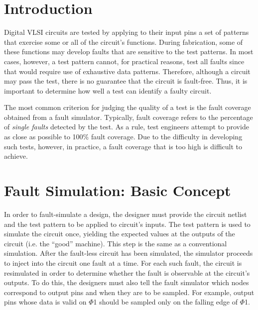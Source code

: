 \newcommand{\bracket}[1]{$\left<\mbox{#1}\right>$}
\newcommand{\BKT}[1]{\bracket{\em #1}}
\newcommand{\OPT}[1]{$\left[\mbox{#1}\right]$}
\newcommand{\irsim}{{\it Irsim}}
\newcommand{\ifsim}{{\it Ifsim}}
\newcommand{\BU}{\mbox{$\bullet$}\ }

\section{Introduction}

Digital VLSI circuits are tested by applying to their input pins a set of
patterns that exercise some or all of the circuit's functions.  During
fabrication, some of these functions may develop faults that are sensitive
to the test patterns.  In most cases, however, a test pattern cannot, for
practical reasons, test all faults since that would require use of
exhaustive data patterns.  Therefore, although a circuit may pass the test,
there is no guarantee that the circuit is fault-free.   Thus, it is
important to determine how well a test can identify a faulty circuit.

The most common criterion for judging the quality of a test is the fault
coverage obtained from a fault simulator.  Typically, fault coverage refers
to the percentage of {\em single faults} detected by the test.  As a rule,
test engineers attempt to provide as close as possible to 100\% fault
coverage.  Due to the difficulty in developing such tests, however, in
practice, a fault coverage that is too high is difficult to achieve.

\section{Fault Simulation: Basic Concept}

In order to fault-simulate a design, the designer must provide the circuit
netlist and the test pattern to be applied to circuit's inputs.  The test
pattern is used to simulate the circuit once, yielding the expected values
at the outputs of the circuit (i.e. the ``good'' machine).  This step is the
same as a conventional simulation.  After the fault-less circuit has been
simulated, the simulator proceeds to inject into the circuit one fault at a
time.  For each such fault, the circuit is resimulated in order to determine
whether the fault is observable at the circuit's outputs.  To do this, the
designers must also tell the fault simulator which nodes correspond to
output pins and when they are to be sampled.  For example, output pins whose
data is valid on {\mbox{$\Phi$}1} should be sampled only on the falling edge
of {\mbox{$\Phi$}1}.

